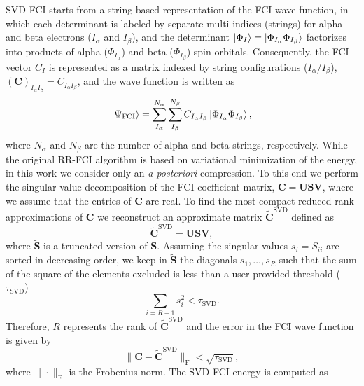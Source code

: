 \documentclass[aip,jcp,amsmath,amssymb, preprint]{revtex4-1}
\begin{document}
SVD-FCI starts from a string-based representation of the FCI wave function,\cite{Handy1980MultiRoot}
in which each determinant is labeled by separate multi-indices (strings) for alpha and beta electrons ($I_{\alpha}$ and $I_{\beta}$), and the determinant  $\ket{\Phi_I} = \ket{\Phi_{I_\alpha} \Phi_{I_\beta}}$ factorizes into products of alpha ($\Phi_{I_\alpha}$) and beta ($\Phi_{I_\beta}$) spin orbitals.
Consequently, the FCI vector $C_I$ is represented as a matrix  indexed by string configurations ($I_{\alpha}$/$I_{\beta}$), $(\mathbf{C})_{I_{\alpha}I_{\beta}} = C_{I_{\alpha}I_{\beta}}$, and the wave function is written as 
\begin{equation}
\ket{\Psi_{\text{FCI}}} =\sum_{I_{\alpha}}^{N_{\alpha}} \sum_{I_{\beta}}^{N_{\beta}}  C_{I_{\alpha}I_{\beta}} \ket{\Phi_{I_\alpha} \Phi_{I_\beta}},
\label{eq:fci_mat}
\end{equation}
where $N_\alpha$ and $N_\beta$ are the number of alpha and beta strings, respectively.
While the original RR-FCI algorithm is based on variational minimization of the energy, in this work we consider only an \textit{a posteriori} compression.
To this end we perform the singular value decomposition of the FCI coefficient matrix,  $\mathbf{C} = \mathbf{U} \mathbf{S} \mathbf{V}$, where we assume that the entries of $\mathbf{C}$ are real.
To find the most compact reduced-rank approximations of $\mathbf{C}$ we reconstruct an approximate matrix $\widetilde{\mathbf{C}}^{\text{SVD}}$ defined as
\begin{equation}
\widetilde{\mathbf{C}}^{\text{SVD}} = \mathbf{U} \widetilde{\mathbf{S}} \mathbf{V},
\end{equation}
where $\widetilde{\mathbf{S}}$ is a truncated version of $\mathbf{S}$.
Assuming the singular values $s_i = S_{ii}$ are sorted in decreasing order, we keep in $\widetilde{\mathbf{S}}$ the diagonals $s_1, \ldots, s_R$ such that the sum of the square of the elements excluded is less than a user-provided threshold ($\tau_{\text{SVD}}$)
\begin{equation}
\sum_{i=R + 1} s_{i}^{2} < \tau_{\text{SVD}}.
\end{equation}
Therefore, $R$ represents the rank of $\widetilde{\mathbf{C}}^{\text{SVD}} $ and the error in the FCI wave function is given by
\begin{equation}
\|\mathbf{C} - \widetilde{\mathbf{C}}^{\text{SVD}}\|_\mathrm{F} < \sqrt{\tau_{\text{SVD}}},
\end{equation}
where $\|\cdot\|_\mathrm{F}$ is the Frobenius norm.
The SVD-FCI energy is computed as
\end{document}
